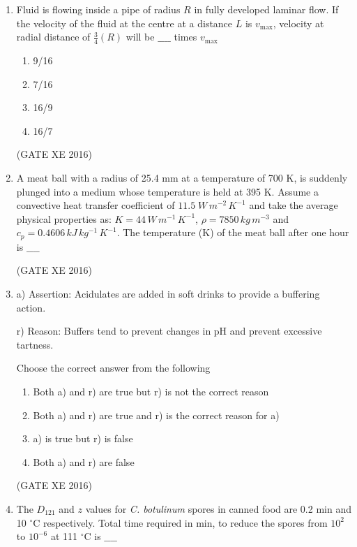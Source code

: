 \documentclass[12pt]{article}
\begin{document}
\begin{enumerate}
\item Fluid is flowing inside a pipe of radius $R$ in fully developed laminar flow. If the velocity of the fluid at the centre at a distance $L$ is $v_{\max}$, velocity at radial distance of $\tfrac{3}{4}(R)$ will be $\_\_\_\_$ times $v_{\max}$

\begin{multicols}{4}
\begin{enumerate}
\item 9/16
\item 7/16
\item 16/9
\item 16/7
\end{enumerate}
\end{multicols}
(GATE XE 2016)

\item A meat ball with a radius of 25.4 mm at a temperature of 700 K, is suddenly plunged into a medium whose temperature is held at 395 K. Assume a convective heat transfer coefficient of $11.5 \; W \, m^{-2} \, K^{-1}$ and take the average physical properties as: $K = 44 \, W \, m^{-1} \, K^{-1}$, $\rho = 7850 \, kg \, m^{-3}$ and $c_p = 0.4606 \, kJ \, kg^{-1} \, K^{-1}$. The temperature (K) of the meat ball after one hour is $\_\_\_\_$

(GATE XE 2016)

\item a) Assertion: Acidulates are added in soft drinks to provide a buffering action.

r) Reason: Buffers tend to prevent changes in pH and prevent excessive tartness.

Choose the correct answer from the following

\begin{enumerate}
\item Both a) and r) are true but r) is not the correct reason
\item Both a) and r) are true and r) is the correct reason for a)
\item a) is true but r) is false
\item Both a) and r) are false
\end{enumerate}
(GATE XE 2016)

\item The $D_{121}$ and $z$ values for \textit{C. botulinum} spores in canned food are 0.2 min and 10 $^{\circ}$C respectively. Total time required in min, to reduce the spores from $10^{2}$ to $10^{-6}$ at 111 $^{\circ}$C is $\_\_\_\_$


\end{enumerate}
\end{document}
